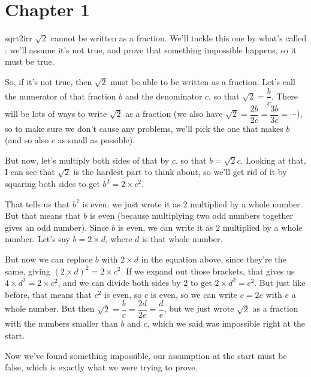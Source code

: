 \section*{Chapter 1}
\begin{thmpf}{sqrt2irr}
    $\sqrt{2}$ cannot be written as a fraction.
    \tcblower
    We'll tackle this one by what's called : we'll assume it's not true, and prove that something impossible happens, so it must be true. 

    So, if it's not true, then $\sqrt{2}$ must be able to be written as a fraction. Let's call the numerator of that fraction $b$ and the denominator $c$, so that $\sqrt{2} = \dfrac{b}{c}$. There will be lots of ways to write $\sqrt{2}$ as a fraction (we also have $\sqrt{2} = \dfrac{2b}{2c} = \dfrac{3b}{3c} = \cdots$), so to make sure we don't cause any problems, we'll pick the one that makes $b$ (and so also $c$ as small as possible).

    But now, let's multiply both sides of that by $c$, so that $b = \sqrt{2}c$. Looking at that, I can see that $\sqrt{2}$ is the hardest part to think about, so we'll get rid of it by squaring both sides to get $b^2 = 2\times c^2$. 

    That tells us that $b^2$ is even: we just wrote it as 2 multiplied by a whole number. But that means that $b$ is even (because multiplying two odd numbers together gives an odd number). Since $b$ is even, we can write it as $2$ multiplied by a whole number. Let's say $b = 2\times d$, where $d$ is that whole number.

    But now we can replace $b$ with $2 \times d$ in the equation above, since they're the same, giving $(2 \times d)^2 = 2 \times c^2$. If we expand out those brackets, that gives us $4 \times d^2 = 2 \times c^2$, and we can divide both sides by $2$ to get $2 \times d^2 = c^2$. But just like before, that means that $c^2$ is even, so $c$ is even, so we can write $c = 2e$ with $e$ a whole number. 
    But then $\sqrt{2} = \dfrac{b}{c} = \dfrac{2d}{2e} = \dfrac{d}{e}$, but we just wrote $\sqrt{2}$ as a fraction with the numbers smaller than $b$ and $c$, which we said was impossible right at the start.

    Now we've found something impossible, our assumption at the start must be false, which is exactly what we were trying to prove. 
\end{thmpf}


